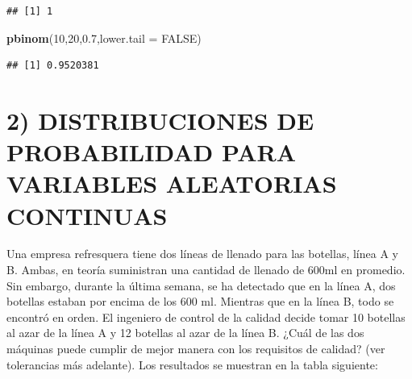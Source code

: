 \documentclass[
]{article}
\newenvironment{Shaded}{\begin{snugshade}}{\end{snugshade}}
\newcommand{\AttributeTok}[1]{\textcolor[rgb]{0.13,0.29,0.53}{#1}}
\newcommand{\ConstantTok}[1]{\textcolor[rgb]{0.56,0.35,0.01}{#1}}
\newcommand{\DecValTok}[1]{\textcolor[rgb]{0.00,0.00,0.81}{#1}}
\newcommand{\FloatTok}[1]{\textcolor[rgb]{0.00,0.00,0.81}{#1}}
\newcommand{\FunctionTok}[1]{\textcolor[rgb]{0.13,0.29,0.53}{\textbf{#1}}}
\newcommand{\NormalTok}[1]{#1}
\begin{document}
\begin{verbatim}
## [1] 1
\end{verbatim}

\begin{Shaded}
\begin{Highlighting}[]
\FunctionTok{pbinom}\NormalTok{(}\DecValTok{10}\NormalTok{,}\DecValTok{20}\NormalTok{,}\FloatTok{0.7}\NormalTok{,}\AttributeTok{lower.tail =} \ConstantTok{FALSE}\NormalTok{)}
\end{Highlighting}
\end{Shaded}

\begin{verbatim}
## [1] 0.9520381
\end{verbatim}

\section{2) DISTRIBUCIONES DE PROBABILIDAD PARA VARIABLES ALEATORIAS
CONTINUAS}\label{distribuciones-de-probabilidad-para-variables-aleatorias-continuas}

Una empresa refresquera tiene dos líneas de llenado para las botellas,
línea A y B. Ambas, en teoría suministran una cantidad de llenado de
600ml en promedio. Sin embargo, durante la última semana, se ha
detectado que en la línea A, dos botellas estaban por encima de los 600
ml. Mientras que en la línea B, todo se encontró en orden. El ingeniero
de control de la calidad decide tomar 10 botellas al azar de la línea A
y 12 botellas al azar de la línea B. ¿Cuál de las dos máquinas puede
cumplir de mejor manera con los requisitos de calidad? (ver tolerancias
más adelante). Los resultados se muestran en la tabla siguiente:
\end{document}
